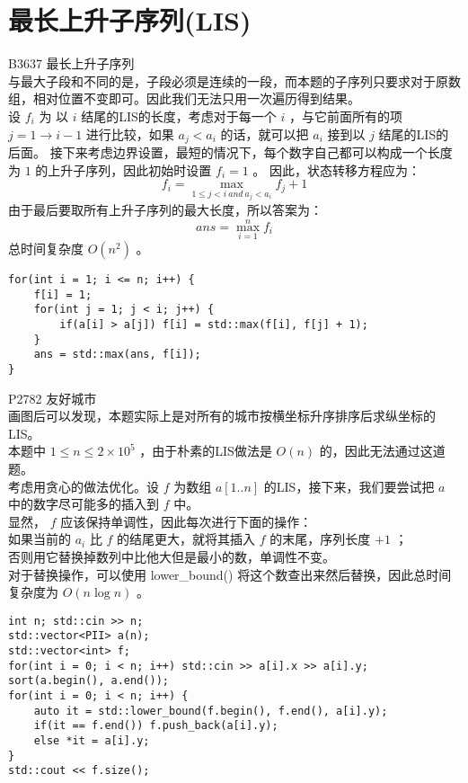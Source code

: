 \documentclass{beamer}
\begin{document}
\section{最长上升子序列(LIS)}
\begin{frame}
B3637 最长上升子序列\\
与最大子段和不同的是，子段必须是连续的一段，而本题的子序列只要求对于原数组，相对位置不变即可。因此我们无法只用一次遍历得到结果。\\ 
设 $f_i$ 为 以 $i$ 结尾的LIS的长度，考虑对于每一个 $i$ ，与它前面所有的项 $j = 1 \rightarrow i - 1$ 进行比较，如果 $a_j < a_i$ 的话，就可以把 $a_i$ 接到以 $j$ 结尾的LIS的后面。
接下来考虑边界设置，最短的情况下，每个数字自己都可以构成一个长度为 $1$ 的上升子序列，因此初始时设置 $f_i = 1$ 。
因此，状态转移方程应为：
$$f_i = \max_{1 \leq j < i \ and \ a_j < a_i}f_j + 1$$
由于最后要取所有上升子序列的最大长度，所以答案为：
$$ans = \max_{i = 1}^{n}f_i$$
总时间复杂度 $O(n^2)$ 。
\end{frame}
\begin{frame}[fragile]
\begin{onlyenv}
\begin{verbatim}
for(int i = 1; i <= n; i++) {
    f[i] = 1;
    for(int j = 1; j < i; j++) {
        if(a[i] > a[j]) f[i] = std::max(f[i], f[j] + 1);
    }
    ans = std::max(ans, f[i]);
}
\end{verbatim}
\end{onlyenv}
\end{frame}
\begin{frame}
P2782 友好城市\\ 
画图后可以发现，本题实际上是对所有的城市按横坐标升序排序后求纵坐标的LIS。\\ 
本题中 $1 \leq n \leq 2 \times 10^5$ ，由于朴素的LIS做法是 $O(n)$ 的，因此无法通过这道题。\\
考虑用贪心的做法优化。设 $f$ 为数组 $a[1..n]$ 的LIS，接下来，我们要尝试把 $a$ 中的数字尽可能多的插入到 $f$ 中。\\显然， $f$ 应该保持单调性，因此每次进行下面的操作：\\ 
如果当前的 $a_i$ 比 $f$ 的结尾更大，就将其插入 $f$ 的末尾，序列长度 $+1$ ；\\ 
否则用它替换掉数列中比他大但是最小的数，单调性不变。\\ 
对于替换操作，可以使用 lower\_bound() 将这个数查出来然后替换，因此总时间复杂度为 $O(n \log n)$ 。
\end{frame}
\begin{frame}[fragile]
\begin{onlyenv}
\begin{verbatim}
int n; std::cin >> n;
std::vector<PII> a(n);
std::vector<int> f;
for(int i = 0; i < n; i++) std::cin >> a[i].x >> a[i].y;
sort(a.begin(), a.end());
for(int i = 0; i < n; i++) {
    auto it = std::lower_bound(f.begin(), f.end(), a[i].y);
    if(it == f.end()) f.push_back(a[i].y);
    else *it = a[i].y;
}
std::cout << f.size();
\end{verbatim}
\end{onlyenv}
\end{frame}
\end{document}
